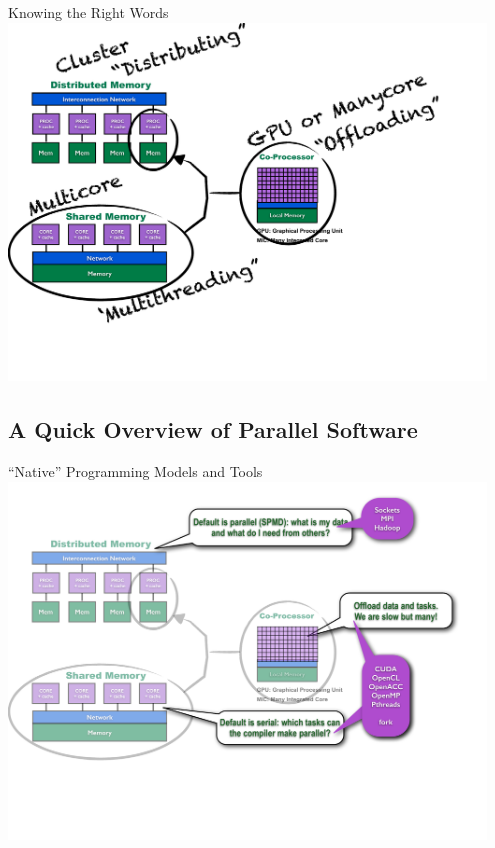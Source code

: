 \begin{frame}{Knowing the Right Words}
\includegraphics[width=0.95\textwidth]
{../common/pics/hardware/ParallelHardware5.pdf}
\end{frame}

\subsection{A Quick Overview of Parallel Software}
\makesubcontentsslidessec

\begin{frame}{``Native'' Programming Models and Tools}
\includegraphics[width=0.95\textwidth]
{../common/pics/hardware/ParallelHardware6.pdf}
\end{frame}

